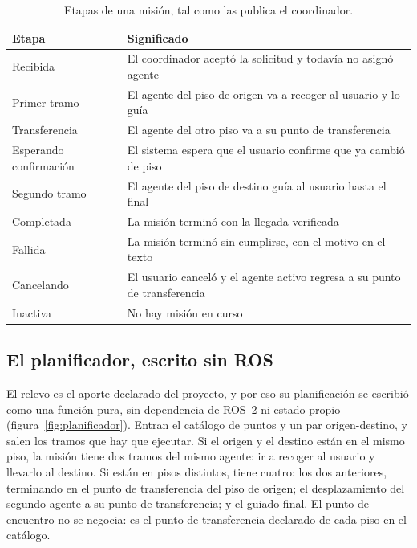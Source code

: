 \begin{table}[htbp]
  \centering\small
  \caption{Etapas de una misión, tal como las publica el coordinador.}
  \label{tab:etapas-mision}
  \begin{tabular}{@{}p{}p{}@{}}
    \toprule
    \textbf{Etapa} & \textbf{Significado} \\ \midrule
    Recibida & El coordinador aceptó la solicitud y todavía no asignó agente \\
    Primer tramo & El agente del piso de origen va a recoger al usuario y lo guía \\
    Transferencia & El agente del otro piso va a su punto de transferencia \\
    Esperando confirmación & El sistema espera que el usuario confirme que ya cambió de piso \\
    Segundo tramo & El agente del piso de destino guía al usuario hasta el final \\
    Completada & La misión terminó con la llegada verificada \\
    Fallida & La misión terminó sin cumplirse, con el motivo en el texto \\
    Cancelando & El usuario canceló y el agente activo regresa a su punto de transferencia \\
    Inactiva & No hay misión en curso \\ \bottomrule
  \end{tabular}
\end{table}

\subsection{El planificador, escrito sin ROS}
\label{sec:planificador}

El relevo es el aporte declarado del proyecto, y por eso su planificación se escribió como una función pura, sin dependencia de ROS~2 ni estado propio (figura~\ref{fig:planificador}). Entran el catálogo de puntos y un par origen-destino, y salen los tramos que hay que ejecutar. Si el origen y el destino están en el mismo piso, la misión
tiene dos tramos del mismo agente: ir a recoger al usuario y llevarlo al destino.
Si están en pisos distintos, tiene cuatro: los dos anteriores, terminando en el
punto de transferencia del piso de origen; el desplazamiento del segundo agente
a su punto de transferencia; y el guiado final. El punto de encuentro no se negocia: es el punto de transferencia declarado de cada piso en el catálogo.

